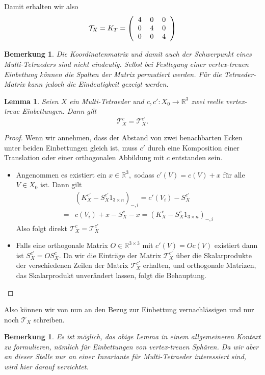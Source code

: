 \documentclass[12pt,titlepage,twoside,cleardoublepage]{article}
\theoremstyle{nummermitklammern}
\newtheorem{lemma}[temp]{Lemma}
\newtheorem{bemerkung}[temp]{Bemerkung}
\newtheorem{lemma}[zahl]{Lemma}
\newtheorem{bemerkung}[zahl]{Bemerkung}
\numberwithin{equation}{section}
\begin{document}
Damit erhalten wir also 
\[
\mathcal{T}_X=K_T=\left(\begin{tabular}{ccc}
4&0&0\\
0&4&0\\
0&0&4\\
\end{tabular}\right)
\]
\begin{bemerkung}
Die Koordinatenmatrix und damit auch der Schwerpunkt  eines Multi-Tetraeders sind nicht eindeutig. Selbst bei Festlegung einer vertex-treuen Einbettung können die Spalten der Matrix permutiert werden. Für die Tetraeder-Matrix kann jedoch die Eindeutigkeit gezeigt werden.
\end{bemerkung}
\begin{lemma}
Seien $X$ ein Multi-Tetraeder und $c,c':X_0\to \mathbb{R}^3$ zwei reelle vertex-treue Einbettungen. Dann gilt 
\[
\mathcal{T}^c_X=\mathcal{T}_X^{c'}.
\]
\end{lemma}
\begin{proof}
Wenn wir annehmen, dass der Abstand von zwei benachbarten Ecken unter beiden Einbettungen gleich ist, muss $c'$ durch eine Komposition einer Translation oder einer orthogonalen Abbildung mit $c$ entstanden sein. 
\begin{itemize}
\item Angenommen es existiert ein $x\in \mathbb{R}^3,$ sodass $c'(V)=c(V)+x$ für alle $V\in X_0$ ist. Dann gilt 
\begin{align*}
&(K_X^{c'}-S_X^{c'}1_{3\times n})_{-,i}=c'(V_i)-S_X^{c'}\\
=&c(V_i)+x-S_X^c-x=(K_X^{c}-S_X^{c}1_{3\times n})_{-,i}
\end{align*}
Also folgt direkt $\mathcal{T}_X^c=\mathcal{T}_X^{c'}$
\item Falls eine orthogonale Matrix $O\in \mathbb{R}^{3\times 3}$ mit $c'(V)=Oc(V)$ existiert dann ist $S_X^{c'}=OS_X^c.$ Da wir die Einträge der Matrix $\mathcal{T}_X^{c'}$ über die Skalarprodukte der verschiedenen Zeilen der Matrix $\mathcal{T}_X^{c'}$ erhalten, und orthogonale Matrizen, das Skalarprodukt unverändert lassen, folgt die Behauptung.
\end{itemize} 
\end{proof}
Also können wir von nun an den Bezug zur Einbettung vernachlässigen und nur noch $\mathcal{T}_X$ schreiben. 
\begin{bemerkung}
Es ist möglich, das obige Lemma in einem allgemeineren Kontext zu formulieren, nämlich für Einbettungen von vertex-treuen Sphären. Da wir aber an dieser Stelle nur an einer Invariante für Multi-Tetraeder interessiert sind, wird hier darauf verzichtet. 
\end{bemerkung}
\end{document}
